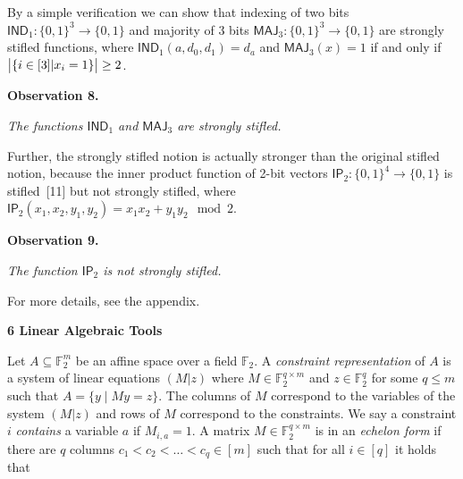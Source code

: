 By a simple verification we can show that indexing of two bits $\mathsf{IND}_{1}:\{0,1\}^{3}\to\{0,1\}$ and majority of 3 bits $\mathsf{MAJ}_{3}:\{0,1\}^{3}\to\{0,1\}$ are strongly stifled functions,
where $\mathsf{IND}_{1}(a,d_{0},d_{1})=d_{a}$ and $\mathsf{MAJ}_{3}(x)=1$ if and only if $\bigl{|}\{i\in[3]|x_{i}=1\}\bigr{|}\geq 2$.\par





\par\medskip\noindent\textbf{
\textbf{Observation 8}\textbf{.}
}\par



\emph{The functions $\mathsf{IND}_{1}$ and $\mathsf{MAJ}_{3}$ are strongly stifled.}\par






Further, the strongly stifled notion is actually stronger than the original stifled notion, because the inner product function of 2-bit vectors $\mathsf{IP}_{2}:\{0,1\}^{4}\to\{0,1\}$ is stifled [11] but not strongly stifled, where $\mathsf{IP}_{2}(x_{1},x_{2},y_{1},y_{2})=x_{1}x_{2}+y_{1}y_{2}\mod 2$.\par





\par\medskip\noindent\textbf{
\textbf{Observation 9}\textbf{.}
}\par



\emph{The function $\mathsf{IP}_{2}$ is not strongly stifled.}\par






For more details, see the appendix.\par





\par\medskip\noindent\textbf{
6 Linear Algebraic Tools}\par




Let $A\subseteq\mathbb{F}_{2}^{m}$ be an affine space over a field $\mathbb{F}_{2}$.
A \emph{constraint representation} of $A$ is a system of linear equations $(M|z)$ where $M\in\mathbb{F}_{2}^{q\times m}$ and $z\in\mathbb{F}_{2}^{q}$ for some $q\leq m$ such that $A=\{y\mid My=z\}$.
The columns of $M$ correspond to the variables of the system $(M|z)$ and rows of $M$ correspond to the constraints.
We say a constraint $i$ \emph{contains} a variable $a$ if $M_{i,a}=1$.
A matrix $M\in\mathbb{F}_{2}^{q\times m}$ is in an \emph{echelon form} if there are $q$ columns $c_{1}<c_{2}<\dots<c_{q}\in[m]$ such that for all $i\in[q]$ it holds that\par


